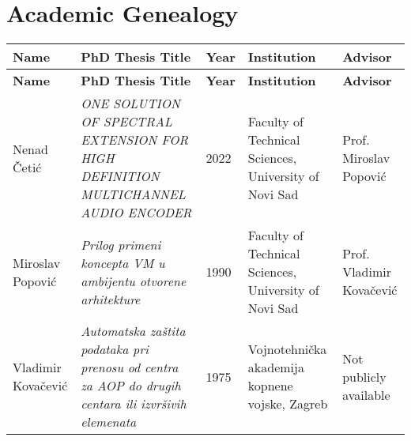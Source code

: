 \documentclass{article}
\begin{document}
\section*{Academic Genealogy}

\begin{longtable}{|p{3.5cm}|p{6.5cm}|p{1.2cm}|p{4.5cm}|p{3.5cm}|}
\hline
\textbf{Name} & \textbf{PhD Thesis Title} & \textbf{Year} & \textbf{Institution} & \textbf{Advisor} \\
\hline
\endfirsthead
\hline
\textbf{Name} & \textbf{PhD Thesis Title} & \textbf{Year} & \textbf{Institution} & \textbf{Advisor} \\
\hline
\endhead

Nenad Četić & \textit{ONE SOLUTION OF SPECTRAL EXTENSION FOR HIGH DEFINITION MULTICHANNEL AUDIO ENCODER} & 2022 & Faculty of Technical Sciences, University of Novi Sad & Prof. Miroslav Popović \\
\hline
Miroslav Popović & \textit{Prilog primeni koncepta VM u ambijentu otvorene arhitekture} & 1990 & Faculty of Technical Sciences, University of Novi Sad & Prof. Vladimir Kovačević \\
\hline
Vladimir Kovačević & \textit{Automatska zaštita podataka pri prenosu od centra za AOP do drugih centara ili izvršivih elemenata} & 1975 & Vojnotehnička akademija kopnene vojske, Zagreb & Not publicly available \\
\hline

\end{longtable}
\end{document}
